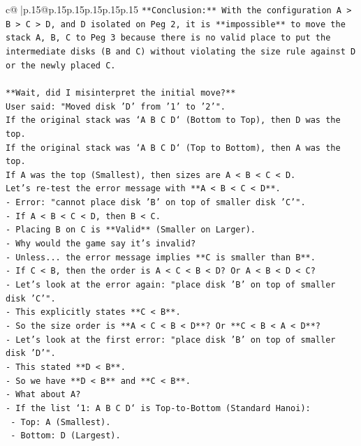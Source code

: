 \documentclass{article}
\begin{document}
{\begin{supertabular}{c@{$\;$}|p{.15\linewidth}@{}p{.15\linewidth}p{.15\linewidth}p{.15\linewidth}p{.15\linewidth}p{.15\linewidth}}
{{{\texttt{**Conclusion:** With the configuration A > B > C > D, and D isolated on Peg 2, it is **impossible** to move the stack A, B, C to Peg 3 because there is no valid place to put the intermediate disks (B and C) without violating the size rule against D or the newly placed C.} \\
\\ 
\texttt{**Wait, did I misinterpret the initial move?**} \\
\texttt{User said: "Moved disk 'D' from '1' to '2'".} \\
\texttt{If the original stack was `A B C D` (Bottom to Top), then D was the top.} \\
\texttt{If the original stack was `A B C D` (Top to Bottom), then A was the top.} \\
\texttt{If A was the top (Smallest), then sizes are A < B < C < D.} \\
\texttt{Let's re{-}test the error message with **A < B < C < D**.} \\
\texttt{{-} Error: "cannot place disk 'B' on top of smaller disk 'C'".} \\
\texttt{{-} If A < B < C < D, then B < C.} \\
\texttt{{-} Placing B on C is **Valid** (Smaller on Larger).} \\
\texttt{{-} Why would the game say it's invalid?} \\
\texttt{{-} Unless... the error message implies **C is smaller than B**.} \\
\texttt{{-} If C < B, then the order is A < C < B < D? Or A < B < D < C?} \\
\texttt{{-} Let's look at the error again: "place disk 'B' on top of smaller disk 'C'".} \\
\texttt{{-} This explicitly states **C < B**.} \\
\texttt{{-} So the size order is **A < C < B < D**? Or **C < B < A < D**?} \\
\texttt{{-} Let's look at the first error: "place disk 'B' on top of smaller disk 'D'".} \\
\texttt{{-} This stated **D < B**.} \\
\texttt{{-} So we have **D < B** and **C < B**.} \\
\texttt{{-} What about A?} \\
\texttt{{-} If the list `1: A B C D` is Top{-}to{-}Bottom (Standard Hanoi):} \\
\texttt{  {-} Top: A (Smallest).} \\
\texttt{  {-} Bottom: D (Largest).} \\
}}}
\end{supertabular}}
\end{document}
